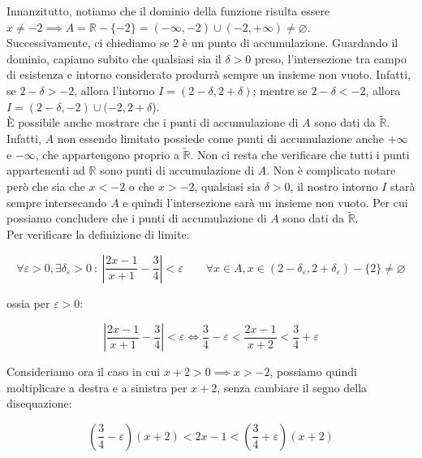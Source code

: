 \documentclass{article}
\begin{document}
\noindent Innanzitutto, notiamo che il dominio della funzione risulta essere $x \neq -2 \implies A = \mathbb{R} - \{-2\} = (-\infty, -2) \cup (-2, + \infty) \neq \varnothing$.\\
Successivamente, ci chiediamo se $2$ è un punto di accumulazione. Guardando il dominio, capiamo subito che qualsiasi sia il $\delta > 0$ preso, l'intersezione tra campo di esistenza e intorno considerato produrrà sempre un insieme non vuoto. Infatti, se $2 - \delta > -2$, allora l'intorno $I = (2 - \delta, 2 + \delta)$; mentre se $2 - \delta < -2$, allora $I = (2-\delta, -2) \cup (-2, 2 + \delta$). \\
È possibile anche mostrare che i punti di accumulazione di $A$ sono dati da $\widetilde{\mathbb{R}}$. Infatti, $A$ non essendo limitato possiede come punti di accumulazione anche $+ \infty$ e $- \infty$, che appartengono proprio a $\widetilde{\mathbb{R}}$. Non ci resta che verificare che tutti i punti appartenenti ad $\mathbb{R}$ sono punti di accumulazione di $A$. Non è complicato notare però che sia che $x < -2$ o che $x > - 2$, qualsiasi sia $\delta > 0$, il nostro intorno $I$ starà sempre intersecando $A$ e quindi l'intersezione sarà un insieme non vuoto. Per cui possiamo concludere che i punti di accumulazione di $A$ sono dati da $\widetilde{\mathbb{R}}$.\\

\noindent Per verificare la definizione di limite:

\begin{equation*}
    \forall \varepsilon > 0, \exists \delta_\varepsilon > 0 \ : \ \left| \frac{2x-1}{x+1} - \frac{3}{4} \right| < \varepsilon \qquad \forall x \in A, x \in (2-\delta_\varepsilon, 2+\delta_\varepsilon) - \{2\} \neq \varnothing
\end{equation*}

\noindent ossia per $\varepsilon > 0$:

\begin{equation*}
    \left| \frac{2x-1}{x+1} - \frac{3}{4} \right| < \varepsilon \iff \frac{3}{4} - \varepsilon < \frac{2x - 1}{x + 2} < \frac{3}{4} + \varepsilon
\end{equation*}

\noindent Consideriamo ora il caso in cui $x + 2 > 0 \implies x > -2$, possiamo quindi moltiplicare a destra e a sinistra per $x + 2$, senza cambiare il segno della disequazione:

\begin{equation*}
    \left(\frac{3}{4} - \varepsilon\right)(x+2) < 2x - 1 < \left(\frac{3}{4} + \varepsilon\right)(x+2)
\end{equation*}
\end{document}

